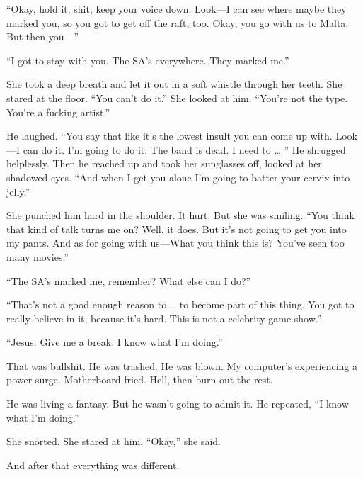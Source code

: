 “Okay, hold it, shit; keep your voice down. Look—I can see where maybe they marked you, so you got to get off the raft, too. Okay, you go with us to Malta. But then you—”

“I got to stay with you. The SA’s everywhere. They marked me.”

She took a deep breath and let it out in a soft whistle through her teeth. She stared at the floor. “You can’t do it.” She looked at him. “You’re not the type. You’re a fucking artist.”

He laughed. “You say that like it’s the lowest insult you can come up with. Look—I can do it. I’m going to do it. The band is dead. I need to … ” He shrugged helplessly. Then he reached up and took her sunglasses off, looked at her shadowed eyes. “And when I get you alone I’m going to batter your cervix into jelly.”

She punched him hard in the shoulder. It hurt. But she was smiling. “You think that kind of talk turns me on? Well, it does. But it’s not going to get you into my pants. And as for going with us—What you think this is? You’ve seen too many movies.”

“The SA’s marked me, remember? What else can I do?”

“That’s not a good enough reason to … to become part of this thing. You got to really believe in it, because it’s hard. This is not a celebrity game show.”

“Jesus. Give me a break. I know what I’m doing.”

That was bullshit. He was trashed. He was blown. My computer’s experiencing a power surge. Motherboard fried. Hell, then burn out the rest.

He was living a fantasy. But he wasn’t going to admit it. He repeated, “I know what I’m doing.”

She snorted. She stared at him. “Okay,” she said.

And after that everything was different.
